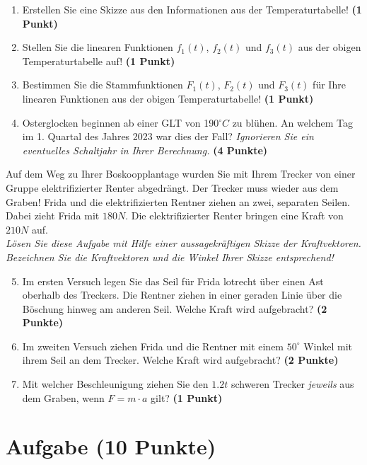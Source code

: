 \documentclass[a4paper, 9pt]{scrartcl}\usepackage[]{graphicx}\usepackage[]{xcolor}
\begin{document}
\begin{enumerate}
\item Erstellen Sie eine Skizze aus den Informationen aus der
  Temperaturtabelle!  \textbf{(1 Punkt)}
\item Stellen Sie die linearen Funktionen $f_1(t)$, $f_2(t)$ und
  $f_3(t)$ aus der obigen Temperaturtabelle auf!  \textbf{(1 Punkt)}
\item Bestimmen Sie die Stammfunktionen $F_1(t)$, $F_2(t)$ und $F_3(t)$ f{\"u}r
  Ihre linearen Funktionen aus der obigen Temperaturtabelle!  \textbf{(1
    Punkt)}
\item Osterglocken beginnen ab einer GLT von 190$^\circ C$ zu bl{\"u}hen. An
  welchem Tag im 1. Quartal des Jahres 2023 war dies der
  Fall? \textit{Ignorieren Sie ein eventuelles Schaltjahr in Ihrer Berechnung.} \textbf{(4 Punkte)}
\end{enumerate}

Auf dem Weg zu Ihrer Boskoopplantage wurden Sie mit Ihrem Trecker von
einer Gruppe elektrifizierter Renter abgedr{\"a}ngt. Der Trecker muss wieder
aus dem Graben! Frida und die elektrifizierten Rentner ziehen an zwei,
separaten Seilen. Dabei zieht Frida mit $180N$. Die
elektrifizierter Renter  bringen eine Kraft von $210N$ auf.\\

\textit{L{\"o}sen Sie diese Aufgabe mit Hilfe einer aussagekr{\"a}ftigen Skizze der
  Kraftvektoren. Bezeichnen Sie die Kraftvektoren und die Winkel Ihrer
  Skizze entsprechend!}

\begin{enumerate}
  \setcounter{enumi}{4}  
\item Im ersten Versuch legen Sie das Seil f{\"u}r Frida lotrecht {\"u}ber einen
  Ast oberhalb des Treckers. Die Rentner ziehen in einer geraden Linie {\"u}ber
  die B{\"o}schung hinweg am anderen Seil. Welche Kraft wird aufgebracht?
  \textbf{(2 Punkte)}
\item Im zweiten Versuch ziehen Frida und die Rentner mit einem
  $50^\circ$ Winkel mit ihrem Seil an dem Trecker. Welche Kraft
  wird aufgebracht? \textbf{(2 Punkte)}
\item Mit welcher Beschleunigung ziehen Sie den $1.2t$ schweren
  Trecker \textit{jeweils} aus dem Graben, wenn $F = m \cdot a$ gilt?
  \textbf{(1 Punkt)}
\end{enumerate}

 
\clearpage

\section{Aufgabe \hfill (10 Punkte)}
\end{document}
